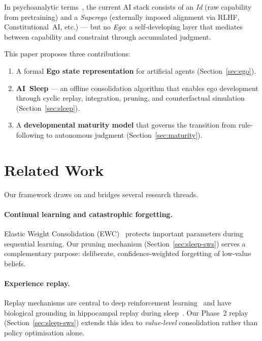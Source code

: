 \documentclass[11pt,a4paper]{article}
\begin{document}
In psychoanalytic terms~\citep{freud1923ego}, the current AI stack
consists of an \emph{Id} (raw capability from pretraining) and a
\emph{Superego} (externally imposed alignment via RLHF,
Constitutional~AI, etc.) --- but no \emph{Ego}: a self-developing layer
that mediates between capability and constraint through accumulated
judgment.

This paper proposes three contributions:
\begin{enumerate}
  \item A formal \textbf{Ego state representation} for artificial agents
        (Section~\ref{sec:ego}).
  \item \textbf{AI~Sleep} --- an offline consolidation algorithm that
        enables ego development through cyclic replay, integration,
        pruning, and counterfactual simulation
        (Section~\ref{sec:sleep}).
  \item A \textbf{developmental maturity model} that governs the
        transition from rule-following to autonomous judgment
        (Section~\ref{sec:maturity}).
\end{enumerate}

\section{Related Work}
\label{sec:related}

Our framework draws on and bridges several research threads.

\paragraph{Continual learning and catastrophic forgetting.}
Elastic Weight Consolidation (EWC)~\citep{kirkpatrick2017overcoming}
protects important parameters during sequential learning.  Our pruning
mechanism (Section~\ref{sec:sleep-sws}) serves a complementary purpose:
deliberate, confidence-weighted forgetting of low-value beliefs.

\paragraph{Experience replay.}
Replay mechanisms are central to deep reinforcement
learning~\citep{mnih2015human} and have biological grounding in
hippocampal replay during sleep~\citep{hassabis2017neuroscience}.  Our
Phase~2 replay (Section~\ref{sec:sleep-sws}) extends this idea to
\emph{value-level} consolidation rather than policy optimisation alone.
\end{document}

